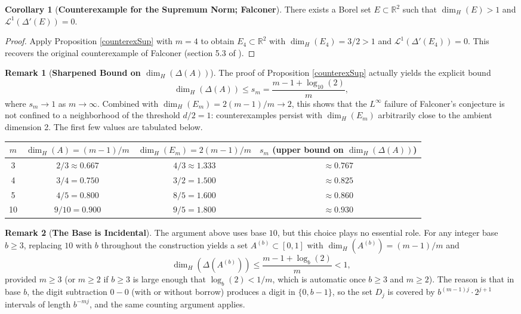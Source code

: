 \documentclass[12pt,a4paper]{report}
\theoremstyle{definition}
\newtheorem{corollary}{Corollary}
\newtheorem{remark}{Remark}
\begin{document}
\begin{corollary}[\textbf{Counterexample for the Supremum Norm; Falconer}] \label{falconerSupCounter}
There exists a Borel set \( E \subset \mathbb{R}^2 \) such that \( \dim_H(E) > 1 \) and \( \mathcal{L}^1(\Delta'(E)) = 0 \).
\end{corollary}
\begin{proof}
Apply Proposition \ref{counterexSup} with $m = 4$ to obtain $E_4 \subset \mathbb{R}^2$ with $\dim_H(E_4) = 3/2 > 1$ and $\mathcal{L}^1(\Delta'(E_4)) = 0$. This recovers the original counterexample of Falconer (section 5.3 of \cite{falconer1985geometry}).
\end{proof}

\begin{remark}[\textbf{Sharpened Bound on $\dim_H(\Delta(A))$}]
The proof of Proposition \ref{counterexSup} actually yields the explicit bound
\[
\dim_H(\Delta(A)) \leq s_m = \frac{m-1 + \log_{10}(2)}{m},
\]
where $s_m \to 1$ as $m \to \infty$. Combined with $\dim_H(E_m) = 2(m-1)/m \to 2$, this shows that the $L^\infty$ failure of Falconer's conjecture is not confined to a neighborhood of the threshold $d/2 = 1$: counterexamples persist with $\dim_H(E_m)$ arbitrarily close to the ambient dimension 2. The first few values are tabulated below.

\begin{center}
\begin{tabular}{cccc}
\toprule
$m$ & $\dim_H(A) = (m-1)/m$ & $\dim_H(E_m) = 2(m-1)/m$ & $s_m$ (upper bound on $\dim_H(\Delta(A))$) \\
\midrule
3 & $2/3 \approx 0.667$ & $4/3 \approx 1.333$ & $\approx 0.767$ \\
4 & $3/4 = 0.750$ & $3/2 = 1.500$ & $\approx 0.825$ \\
5 & $4/5 = 0.800$ & $8/5 = 1.600$ & $\approx 0.860$ \\
10 & $9/10 = 0.900$ & $9/5 = 1.800$ & $\approx 0.930$ \\
\bottomrule
\end{tabular}
\end{center}
\end{remark}

\begin{remark}[\textbf{The Base is Incidental}]
The argument above uses base $10$, but this choice plays no essential role. For any integer base $b \geq 3$, replacing $10$ with $b$ throughout the construction yields a set $A^{(b)} \subset [0,1]$ with $\dim_H(A^{(b)}) = (m-1)/m$ and
\[
\dim_H(\Delta(A^{(b)})) \leq \frac{m-1 + \log_b(2)}{m} < 1,
\]
provided $m \geq 3$ (or $m \geq 2$ if $b \geq 3$ is large enough that $\log_b(2) < 1/m$, which is automatic once $b \geq 3$ and $m \geq 2$). The reason is that in base $b$, the digit subtraction $0 - 0$ (with or without borrow) produces a digit in $\{0, b-1\}$, so the set $D_j$ is covered by $b^{(m-1)j} \cdot 2^{j+1}$ intervals of length $b^{-mj}$, and the same counting argument applies.
\end{remark}
\end{document}
